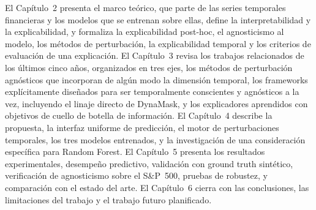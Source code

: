El Capítulo~2 presenta el marco teórico, que parte de las series temporales financieras y los modelos que se entrenan sobre ellas, define la interpretabilidad y la explicabilidad, y formaliza la explicabilidad post-hoc, el agnosticismo al modelo, los métodos de perturbación, la explicabilidad temporal y los criterios de evaluación de una explicación. El Capítulo~3 revisa los trabajos relacionados de los últimos cinco años, organizados en tres ejes, los métodos de perturbación agnósticos que incorporan de algún modo la dimensión temporal, los frameworks explícitamente diseñados para ser temporalmente conscientes y agnósticos a la vez, incluyendo el linaje directo de DynaMask, y los explicadores aprendidos con objetivos de cuello de botella de información. El Capítulo~4 describe la propuesta, la interfaz uniforme de predicción, el motor de perturbaciones temporales, los tres modelos entrenados, y la investigación de una consideración específica para Random Forest. El Capítulo~5 presenta los resultados experimentales, desempeño predictivo, validación con ground truth sintético, verificación de agnosticismo sobre el S\&P~500, pruebas de robustez, y comparación con el estado del arte. El Capítulo~6 cierra con las conclusiones, las limitaciones del trabajo y el trabajo futuro planificado.
